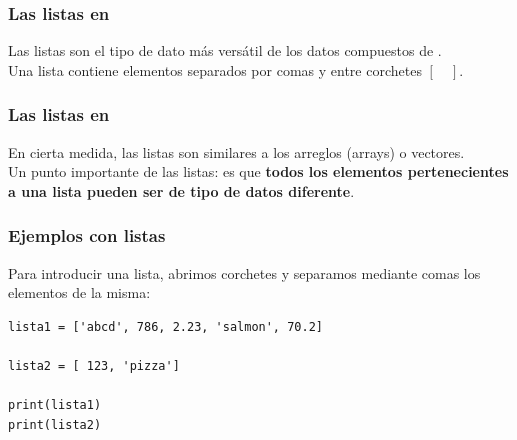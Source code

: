 \documentclass[12pt]{beamer}
\begin{document}
\begin{frame}
\frametitle{Las listas en \python}
Las listas son el tipo de dato más versátil de los datos compuestos de \python.
\\
\bigskip
Una lista contiene elementos separados por comas y entre corchetes $[ \quad ]$.
\end{frame}
\begin{frame}
\frametitle{Las listas en \python}
En cierta medida, las listas son similares a los arreglos (arrays) o vectores.
\\
\bigskip
Un punto importante de las listas: \pause es que \textbf{todos los elementos pertenecientes a una lista pueden ser de tipo de datos diferente}.
\end{frame}
\begin{frame}[fragile]
\frametitle{Ejemplos con listas}
Para introducir una lista, abrimos corchetes y separamos mediante comas los elementos de la misma:
\pause
\begin{lstlisting}[caption=Definiendo dos listas]
lista1 = ['abcd', 786, 2.23, 'salmon', 70.2]

lista2 = [ 123, 'pizza']

print(lista1)
print(lista2)
\end{lstlisting}
\end{frame}
\end{document}

